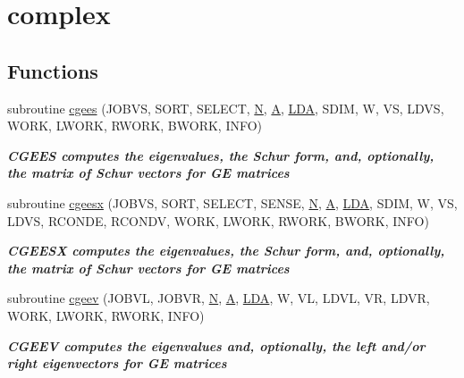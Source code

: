 \hypertarget{group__complexGEeigen}{}\section{complex}
\label{group__complexGEeigen}
\subsection*{Functions}
\begin{DoxyCompactItemize}
\item 
subroutine \hyperlink{group__complexGEeigen_ga6116f4ac8725e779da5d28d3f858ad2f}{cgees} (J\+O\+B\+V\+S, S\+O\+R\+T, S\+E\+L\+E\+C\+T, \hyperlink{polmisc_8c_a0240ac851181b84ac374872dc5434ee4}{N}, \hyperlink{classA}{A}, \hyperlink{example__user_8c_ae946da542ce0db94dced19b2ecefd1aa}{L\+D\+A}, S\+D\+I\+M, W, V\+S, L\+D\+V\+S, W\+O\+R\+K, L\+W\+O\+R\+K, R\+W\+O\+R\+K, B\+W\+O\+R\+K, I\+N\+F\+O)
\begin{DoxyCompactList}\small\item\em {\bfseries  C\+G\+E\+E\+S computes the eigenvalues, the Schur form, and, optionally, the matrix of Schur vectors for G\+E matrices} \end{DoxyCompactList}\item 
subroutine \hyperlink{group__complexGEeigen_ga788eda36c325ae49831c608588adaa69}{cgeesx} (J\+O\+B\+V\+S, S\+O\+R\+T, S\+E\+L\+E\+C\+T, S\+E\+N\+S\+E, \hyperlink{polmisc_8c_a0240ac851181b84ac374872dc5434ee4}{N}, \hyperlink{classA}{A}, \hyperlink{example__user_8c_ae946da542ce0db94dced19b2ecefd1aa}{L\+D\+A}, S\+D\+I\+M, W, V\+S, L\+D\+V\+S, R\+C\+O\+N\+D\+E, R\+C\+O\+N\+D\+V, W\+O\+R\+K, L\+W\+O\+R\+K, R\+W\+O\+R\+K, B\+W\+O\+R\+K, I\+N\+F\+O)
\begin{DoxyCompactList}\small\item\em {\bfseries  C\+G\+E\+E\+S\+X computes the eigenvalues, the Schur form, and, optionally, the matrix of Schur vectors for G\+E matrices} \end{DoxyCompactList}\item 
subroutine \hyperlink{group__complexGEeigen_ga175ced0ce627161ef2f052fc7ceabe5e}{cgeev} (J\+O\+B\+V\+L, J\+O\+B\+V\+R, \hyperlink{polmisc_8c_a0240ac851181b84ac374872dc5434ee4}{N}, \hyperlink{classA}{A}, \hyperlink{example__user_8c_ae946da542ce0db94dced19b2ecefd1aa}{L\+D\+A}, W, V\+L, L\+D\+V\+L, V\+R, L\+D\+V\+R, W\+O\+R\+K, L\+W\+O\+R\+K, R\+W\+O\+R\+K, I\+N\+F\+O)
\begin{DoxyCompactList}\small\item\em {\bfseries  C\+G\+E\+E\+V computes the eigenvalues and, optionally, the left and/or right eigenvectors for G\+E matrices} \end{DoxyCompactList}\item 

\end{DoxyCompactItemize}

